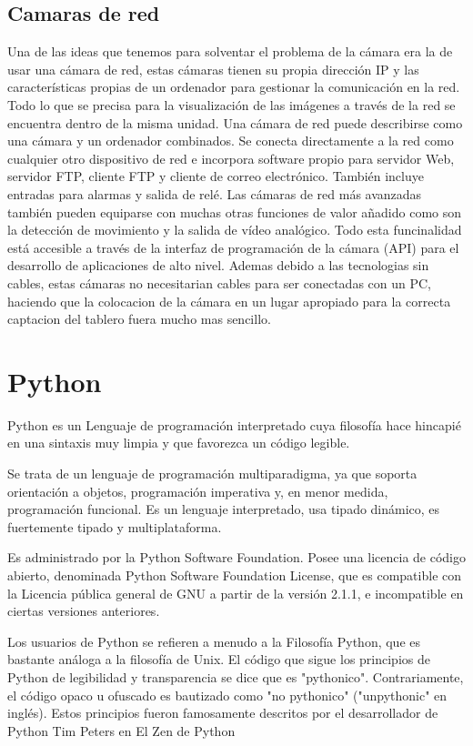\documentclass[12pt,a4paper]{report}
\begin{document}
\section{Camaras de red}

Una de las ideas que tenemos para solventar el problema de la cámara era la de
usar una cámara de red, estas cámaras tienen su propia dirección IP y las
características
propias de un ordenador para gestionar la comunicación en la red.
Todo lo que se precisa para la visualización de las imágenes a través
de la red se encuentra dentro de la misma unidad.
Una cámara de red puede describirse como una cámara y un
ordenador combinados. Se conecta directamente a la red como
cualquier otro dispositivo de red e incorpora software propio para
servidor Web, servidor FTP, cliente FTP y cliente de correo electrónico.
También incluye entradas para alarmas y salida de relé.
Las cámaras de red más avanzadas también pueden equiparse con
muchas otras funciones de valor añadido como son la detección de
movimiento y la salida de vídeo analógico.
Todo esta funcinalidad está accesible a través de la interfaz de
programación de la cámara (API) para el desarrollo de aplicaciones de
alto nivel.
Ademas debido a las tecnologias sin cables, estas cámaras no necesitarian cables
para ser conectadas con un PC, haciendo que la colocacion de la cámara en un
lugar apropiado para la correcta captacion del tablero fuera mucho mas sencillo.


\chapter{Python}

Python es un Lenguaje de programación interpretado cuya filosofía hace hincapié
en una sintaxis muy limpia y que favorezca un código legible.

Se trata de un lenguaje de programación multiparadigma, ya que soporta
orientación a objetos, programación imperativa y, en menor medida, programación
funcional. Es un lenguaje interpretado, usa tipado dinámico, es fuertemente
tipado y multiplataforma.

Es administrado por la Python Software Foundation. Posee una licencia de código
abierto, denominada Python Software Foundation License, que es compatible con
la Licencia pública general de GNU a partir de la versión 2.1.1, e incompatible
en ciertas versiones anteriores.

Los usuarios de Python se refieren a menudo a la Filosofía Python, que es
bastante análoga a la filosofía de Unix. El código que sigue los principios de
Python de legibilidad y transparencia se dice que es "pythonico".
Contrariamente, el código opaco u ofuscado es bautizado como "no pythonico"
("unpythonic" en inglés). Estos principios fueron famosamente descritos por el
desarrollador de Python Tim Peters en El Zen de Python
\end{document}
